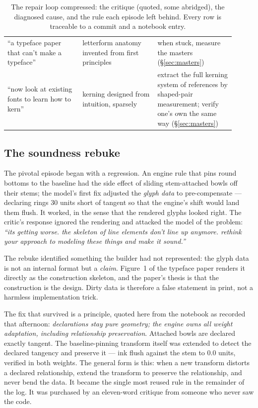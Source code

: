 \documentclass[11pt]{article}
\begin{document}
\begin{table}[t]
\begin{tabular}{p{0.30\linewidth}p{0.30\linewidth}p{0.31\linewidth}}
``a typeface paper that can't make a typeface'' & letterform anatomy invented from first principles & when stuck, measure the masters (§\ref{sec:masters}) \\
``now look at existing fonts to learn how to kern'' & kerning designed from intuition, sparsely & extract the full kerning system of references by shaped-pair measurement; verify one's own the same way (§\ref{sec:masters}) \\
\bottomrule
\end{tabular}
\caption{The repair loop compressed: the critique (quoted, some abridged), the diagnosed cause, and the rule each episode left behind. Every row is traceable to a commit and a notebook entry.}
\label{tab:episodes}
\end{table}

\subsection{The soundness rebuke}\label{sec:sound}

The pivotal episode began with a regression. An engine rule that pins round bottoms to the baseline had the side effect of sliding stem-attached bowls off their stems; the model's first fix adjusted the \emph{glyph data} to pre-compensate — declaring rings 30 units short of tangent so that the engine's shift would land them flush. It worked, in the sense that the rendered glyphs looked right. The critic's response ignored the rendering and attacked the model of the problem: \emph{``its getting worse. the skeleton of line elements don't line up anymore. rethink your approach to modeling these things and make it sound.''}

The rebuke identified something the builder had not represented: the glyph data is not an internal format but a \emph{claim}. Figure~1 of the typeface paper renders it directly as the construction skeleton, and the paper's thesis is that the construction is the design. Dirty data is therefore a false statement in print, not a harmless implementation trick.

The fix that survived is a principle, quoted here from the notebook as recorded that afternoon: \emph{declarations stay pure geometry; the engine owns all weight adaptation, including relationship preservation}. Attached bowls are declared exactly tangent. The baseline-pinning transform itself was extended to detect the declared tangency and preserve it — ink flush against the stem to $0.0$ units, verified in both weights. The general form is this: when a new transform distorts a declared relationship, extend the transform to preserve the relationship, and never bend the data. It became the single most reused rule in the remainder of the log. It was purchased by an eleven-word critique from someone who never saw the code.
\end{document}
